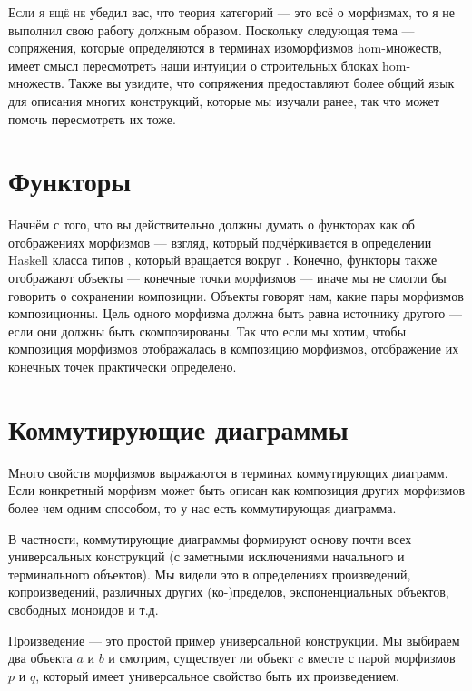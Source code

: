 
\lettrine[lhang=0.17]{Е}{сли я ещё не} убедил вас, что теория категорий --- это всё о
морфизмах, то я не выполнил свою работу должным образом. Поскольку следующая тема ---
сопряжения, которые определяются в терминах изоморфизмов hom-множеств,
имеет смысл пересмотреть наши интуиции о строительных блоках
hom-множеств. Также вы увидите, что сопряжения предоставляют более общий
язык для описания многих конструкций, которые мы изучали ранее, так что
может помочь пересмотреть их тоже.

\section{Функторы}

Начнём с того, что вы действительно должны думать о функторах как об отображениях
морфизмов --- взгляд, который подчёркивается в определении Haskell
класса типов , который вращается вокруг . Конечно,
функторы также отображают объекты --- конечные точки морфизмов ---
иначе мы не смогли бы говорить о сохранении композиции.
Объекты говорят нам, какие пары морфизмов композиционны. Цель
одного морфизма должна быть равна источнику другого --- если они должны быть
скомпозированы. Так что если мы хотим, чтобы композиция морфизмов отображалась в
композицию  морфизмов, отображение их
конечных точек практически определено.

\section{Коммутирующие диаграммы}

Много свойств морфизмов выражаются в терминах коммутирующих
диаграмм. Если конкретный морфизм может быть описан как композиция
других морфизмов более чем одним способом, то у нас есть коммутирующая диаграмма.

В частности, коммутирующие диаграммы формируют основу почти всех универсальных
конструкций (с заметными исключениями начального и терминального
объектов). Мы видели это в определениях произведений, копроизведений,
различных других (ко-)пределов, экспоненциальных объектов, свободных моноидов и т.д.

Произведение --- это простой пример универсальной конструкции. Мы выбираем два
объекта $a$ и $b$ и смотрим, существует ли объект
$c$ вместе с парой морфизмов $p$ и $q$,
который имеет универсальное свойство быть их произведением.


